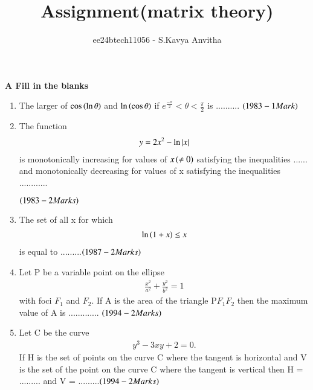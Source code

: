 \documentclass[journal,12pt,twocolumn]{IEEEtran}
\theoremstyle{remark}
\begin{document}

\vspace{3cm}

\title{Assignment(matrix theory)}
\author{ee24btech11056 - S.Kavya Anvitha}
\maketitle
\textbf{A Fill in the blanks}\\
\begin{enumerate}
	\item The larger of $\cos \left(\ln \theta\right)$ and 
$\ln \left(\cos \theta\right)$ if 
$e^{\frac{-\pi}{2}}< \theta< \frac{\pi}{2}$
is ..........
		\hfill$\left(1983 - 1 Mark\right)$\\

	\item The function \begin{align*}y=2x^{2}-\ln \left\vert x\right\vert\end{align*}
is monotonically increasing for values of $x\left(\neq0\right)$ satisfying
the inequalities ...... and monotonically decreasing for values of x 
satisfying the inequalities  ............

		\hfill$\left(1983 - 2 Marks\right)$\\

	\item The set of all x for which \begin{align*}\ln \left(1+x\right) \leq x\end{align*} is equal 
to .........\hfill$\left(1987 - 2 Marks\right)$\\

         \item Let P be a variable point on the ellipse
\begin{align*}\frac{x^2}{a^2}+\frac{y^2}{b^2} = 1\end{align*}
with foci $F_1$ and $F_2$. If A is the area of the triangle P$F_1$$F_2$ 
then the maximum value of A is ............. \hfill$\left(1994 - 2 Marks\right)$\\

         \item Let C be the curve \begin{align*}y^3 - 3xy + 2 = 0.\end{align*} If H is the set of
points on the curve C where the tangent is horizontal and V is
the set of the point on the curve C where the tangent is vertical
then H = ......... and V = .........\hfill$\left(1994 - 2 Marks\right)$\\
\end{enumerate}
\end{document}
